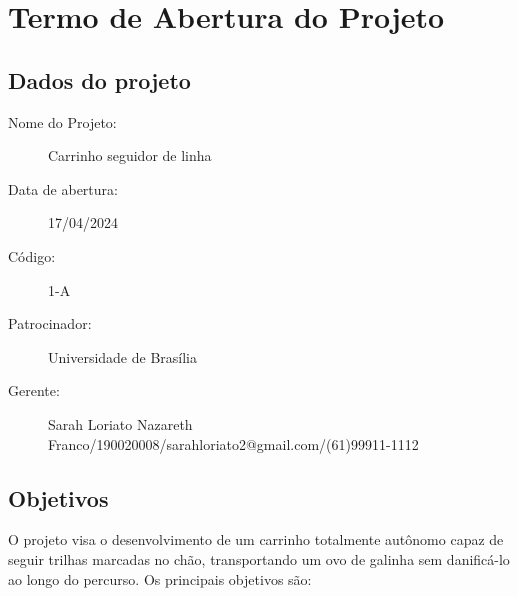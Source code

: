 \chapter{Termo de Abertura do Projeto}


\section{Dados do projeto}
\begin{description}
    \item [Nome do Projeto:] Carrinho seguidor de linha
    \item [Data de abertura:] 17/04/2024
    \item [Código:] 1-A
    \item [Patrocinador:] Universidade de Brasília
    \item [Gerente:] Sarah Loriato Nazareth Franco/190020008/sarahloriato2@gmail.com/(61)99911-1112
\end{description}

\section{Objetivos}
O projeto visa o desenvolvimento de um carrinho totalmente autônomo capaz de seguir trilhas marcadas no chão, transportando um ovo de galinha sem danificá-lo ao longo do percurso. Os principais objetivos são:

